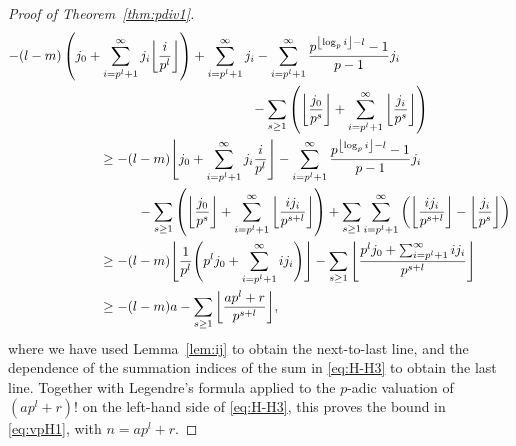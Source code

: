 \documentclass[12pt,reqno]{amsart}
\numberwithin{equation}{section}
\theoremstyle{remark}
\begin{document}
\begin{proof}[Proof of Theorem~{\em \ref{thm:pdiv1}}]
{\allowdisplaybreaks
\begin{align}
\notag
-(l-m)&\left(j_0+\sum_{i=p^l+1}^\infty j_i{\left\lfloor{\frac {i} {p^{l}}}\right\rfloor} \right)
+\sum_{i=p^{l}+1}^{\infty} j_{i}
-\sum_{i=p^{l}+1}^{\infty} \frac {p^{{\left\lfloor{\log_pi}\right\rfloor}-l}-1} {p-1}j_{i}\\
\notag
&\kern5cm
-\sum_{s\ge1}\left({\left\lfloor{\frac {j_0} {p^s}}\right\rfloor}
+\sum_{i=p^l+1}^\infty{\left\lfloor{\frac {j_i} {p^s}}\right\rfloor}\right)\\
\notag
&\kern1cm
\ge
-(l-m)\Bigg\lfloor j_0+\sum_{i=p^l+1}^\infty j_i\frac {i} {p^{l}} \Bigg\rfloor
-\sum_{i=p^{l}+1}^{\infty} \frac {p^{{\left\lfloor{\log_pi}\right\rfloor}-l}-1} {p-1}j_{i}\\
\notag
&\kern2cm
-\sum_{s\ge1}\left({\left\lfloor{\frac {j_0} {p^s}}\right\rfloor}
+\sum_{i=p^l+1}^\infty{\left\lfloor{\frac {ij_i} {p^{s+l}}}\right\rfloor}\right)
+\sum_{s\ge1}
\sum_{i=p^l+1}^\infty\left({\left\lfloor{\frac {ij_i} {p^{s+l}}}\right\rfloor}
-{\left\lfloor{\frac {j_i} {p^{s}}}\right\rfloor}
\right)\\
\notag
&\kern1cm
\ge
-(l-m)\Bigg\lfloor{\frac {1} {p^l}
\Bigg(p^lj_0+\sum_{i=p^l+1}^\infty ij_i\Bigg)}\Bigg\rfloor
-\sum_{s\ge1}{\left\lfloor{\frac {p^lj_0+\sum_{i=p^l+1}^\infty ij_i} {p^{s+l}}}\right\rfloor}\\
&\kern1cm
\ge
-(l-m)a
-\sum_{s\ge1}{\left\lfloor{\frac {ap^l+r} {p^{s+l}}}\right\rfloor},
\label{eq:bound}
\end{align}}where we have used Lemma~\ref{lem:ij} to obtain the next-to-last line, and
the dependence of the summation indices of the sum
in \eqref{eq:H-H3} to obtain the last line.
Together with Legendre's formula \cite[p.~10]{LegeAA} applied to the
$p$-adic valuation of $(ap^l+r)!$ on the left-hand side of \eqref{eq:H-H3}, 
this proves the bound in
\eqref{eq:vpH1}, with $n=ap^l+r$.


\end{proof}
\end{document}
